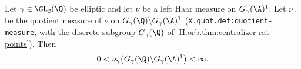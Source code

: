 Let $\gamma\in\GL_2(\Q)$ be elliptic and let $\nu$ be a left Haar measure on $G_\gamma(\A)^1$. Let $\nu_\gamma$ be the quotient
measure of $\nu$ on $G_\gamma(\Q)\backslash G_\gamma(\A)^1$ (\texttt{X.quot.def:quotient-measure}, with the discrete subgroup
$G_\gamma(\Q)$ of \cref{II.orb.thm:centralizer-rat-points}). Then
\[
  0<\nu_\gamma\bigl(G_\gamma(\Q)\backslash G_\gamma(\A)^1\bigr)<\infty.
\]
